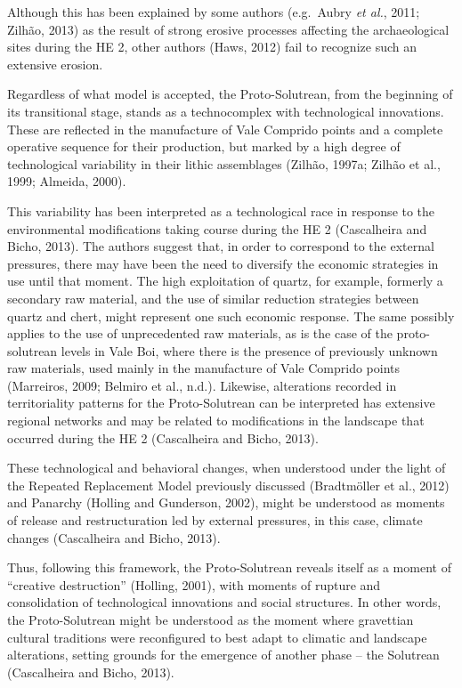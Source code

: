 \documentclass[12pt,twoside]{reedthesis}
\begin{document}
Although this has been explained by some authors (e.g.~Aubry \emph{et al.}, 2011; Zilhão, 2013) as the result of strong erosive processes affecting the archaeological sites during the HE 2, other authors (Haws, 2012) fail to recognize such an extensive erosion.

Regardless of what model is accepted, the Proto-Solutrean, from the beginning of its transitional stage, stands as a technocomplex with technological innovations. These are reflected in the manufacture of Vale Comprido points and a complete operative sequence for their production, but marked by a high degree of technological variability in their lithic assemblages (Zilhão, 1997a; Zilhão et al., 1999; Almeida, 2000).

This variability has been interpreted as a technological race in response to the environmental modifications taking course during the HE 2 (Cascalheira and Bicho, 2013). The authors suggest that, in order to correspond to the external pressures, there may have been the need to diversify the economic strategies in use until that moment. The high exploitation of quartz, for example, formerly a secondary raw material, and the use of similar reduction strategies between quartz and chert, might represent one such economic response. The same possibly applies to the use of unprecedented raw materials, as is the case of the proto-solutrean levels in Vale Boi, where there is the presence of previously unknown raw materials, used mainly in the manufacture of Vale Comprido points (Marreiros, 2009; Belmiro et al., n.d.). Likewise, alterations recorded in territoriality patterns for the Proto-Solutrean can be interpreted has extensive regional networks and may be related to modifications in the landscape that occurred during the HE 2 (Cascalheira and Bicho, 2013).

These technological and behavioral changes, when understood under the light of the Repeated Replacement Model previously discussed (Bradtmöller et al., 2012) and Panarchy (Holling and Gunderson, 2002), might be understood as moments of release and restructuration led by external pressures, in this case, climate changes (Cascalheira and Bicho, 2013).

Thus, following this framework, the Proto-Solutrean reveals itself as a moment of ``creative destruction'' (Holling, 2001), with moments of rupture and consolidation of technological innovations and social structures. In other words, the Proto-Solutrean might be understood as the moment where gravettian cultural traditions were reconfigured to best adapt to climatic and landscape alterations, setting grounds for the emergence of another phase -- the Solutrean (Cascalheira and Bicho, 2013).
\end{document}
